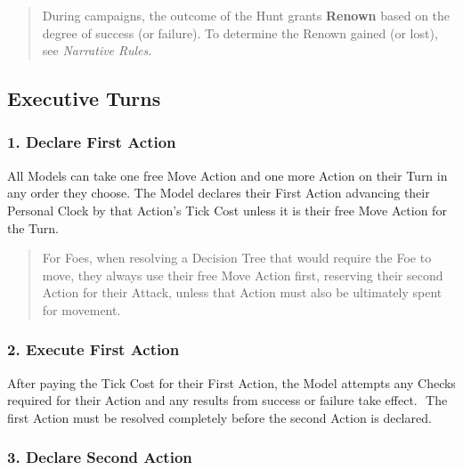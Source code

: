 \documentclass[
]{book}
\begin{document}
\begin{quote}
During campaigns, the outcome of the Hunt grants \textbf{Renown} based on the degree of success (or failure). To determine the Renown gained (or lost), see \emph{Narrative Rules}.
\end{quote}

\hypertarget{turns}{%
\subsection*{Executive Turns}\label{turns}}

\hypertarget{declare-first-action}{%
\subsubsection*{1. Declare First Action}\label{declare-first-action}}

All Models can take one free Move Action and one more Action on their Turn in any order they choose. The Model declares their First Action advancing their Personal Clock by that Action's Tick Cost unless it is their free Move Action for the Turn.

\begin{quote}
For Foes, when resolving a Decision Tree that would require the Foe to move, they always use their free Move Action first, reserving their second Action for their Attack, unless that Action must also be ultimately spent for movement.
\end{quote}

\hypertarget{execute-first-action}{%
\subsubsection*{2. Execute First Action}\label{execute-first-action}}

After paying the Tick Cost for their First Action, the Model attempts any Checks required for their Action and any results from success or failure take effect.  The first Action must be resolved completely before the second Action is declared.

\hypertarget{declare-second-action}{%
\subsubsection*{3. Declare Second Action}\label{declare-second-action}}
\end{document}
